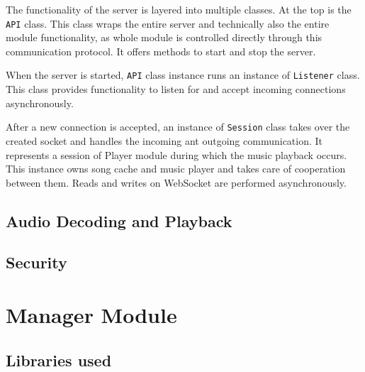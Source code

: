 The functionality of the server is layered into multiple classes. At the top is the \texttt{API} class. This class wraps the entire server and technically also the entire module functionality, as whole module is controlled directly through this communication protocol. It offers methods to start and stop the server.
\par
When the server is started, \texttt{API} class instance runs an instance of \texttt{Listener} class. This class provides functionality to listen for and accept incoming connections asynchronously.
\par
After a new connection is accepted, an instance of \texttt{Session} class takes over the created socket and handles the incoming ant outgoing communication. It represents a session of Player module during which the music playback occurs. This instance owns song cache and music player and takes care of cooperation between them. Reads and writes on WebSocket are performed asynchronously.

\subsection{Audio Decoding and Playback}

\subsection{Security}

\section{Manager Module}

\subsection{Libraries used}

